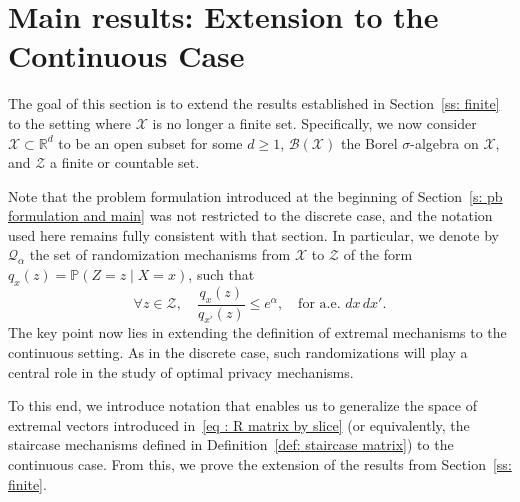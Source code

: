 \documentclass[a4paper, 11pt]{article}
\theoremstyle{definition}
\newcommand{\arnaud}[1]{\todo[color=green!20]{{ #1}}}
\begin{document}
{\section{Main results: Extension to the Continuous Case}{\label{ss: infinite}}

The goal of this section is to extend the results established in Section~\ref{ss: finite} to the setting where \( \mathcal{X} \) is no longer a finite set. Specifically, we now consider \( \mathcal{X} \subset \mathbb{R}^d \) to be an open subset for some \( d \geq 1 \), \( \mathcal{B}(\mathcal{X}) \) the Borel \( \sigma \)-algebra on \( \mathcal{X} \), and \( \mathcal{Z} \) a finite or countable set.



Note that the problem formulation introduced at the beginning of Section~\ref{s: pb formulation and main} was not restricted to the discrete case, and the notation used here remains fully consistent with that section. In particular, we denote by $\mathcal{Q}_\alpha$ the set of randomization mechanisms from $\mathcal{X}$ to $\mathcal{Z}$ of the form $q_x(z) = \mathbb{P}(Z = z \mid X = x)$, such that
\begin{equation*}
	\forall z \in \mathcal{Z}, \quad \frac{q_x(z)}{q_{x'}(z)} \le e^\alpha, \quad \text{for a.e. } dx \, dx'.
\end{equation*}
The key point now lies in extending the definition of extremal mechanisms to the continuous setting. As in the discrete case, such randomizations will play a central role in the study of optimal privacy mechanisms.

To this end, we introduce notation that enables us to generalize the space of extremal vectors introduced in~\eqref{eq : R matrix by slice} (or equivalently, the staircase mechanisms defined in Definition~\ref{def: staircase matrix}) to the continuous case. From this, we prove the extension of the results from Section~\ref{ss: finite}.

}
\end{document}
